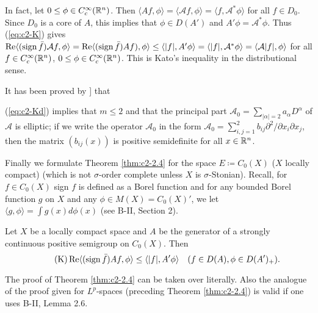 In fact, let $0 \leq \phi \in C_{c}^{\infty}(\mathbb{R}^n)$.
Then $\langle Af,\phi \rangle = \langle \mathcal{A}f,\phi \rangle = \langle f,\mathcal{A}^{*}\phi \rangle$ for all $f \in D_{0}$.
Since $D_{0}$ is a core of $A$, this implies that $\phi \in D(A')$ and $A'\phi = \mathcal{A}^{*}\phi$.
Thus (\ref{eq:c2-K})   gives $\mathop{}\!\mathrm{Re}\langle(\operatorname{sign} \bar{f})\mathcal{A}f,\phi \rangle = \mathop{}\!\mathrm{Re}\langle(\operatorname{sign} \bar{f})Af),\phi \rangle \leq \langle |f|,A'\phi \rangle = \langle |f|,\mathcal{A}^{*}\phi \rangle = \langle \mathcal{A}|f|,\phi \rangle$ for all $f \in C_{c}^{\infty}(\mathbb{R}^n)$, $0 \leq \phi \in C_{c}^{\infty}(\mathbb{R}^n)$.
This is Kato's inequality in the distributional sense.

\begin{remark*}\label{rem:c2-3.0}
It has been proved by \citet{miyajimaokazawa:1984}] that 

 (\ref{eq:c2-Kd}) implies that $m \leq 2$ and that the principal part $\mathcal{A}_{0} = \sum_{|\alpha|=2} a_{\alpha} D^{\alpha}$ of $\mathcal{A}$ is elliptic; \ie if we write the operator $\mathcal{A}_{0}$ in the form $\mathcal{A}_{0} = \sum_{i,j=1}^{2} b_{ij} \partial^{2}/\partial x_{i} \partial x_{j}$, then the matrix $(b_{ij}(x))$ is positive semidefinite for all $x \in \mathbb{R}^n$.
\end{remark*}

Finally we formulate Theorem \ref{thm:c2-2.4}   for the space $E \coloneq C_{0}(X)$ ($X$ locally compact) (which is not $\sigma$-order complete unless $X$ is $\sigma$-Stonian).
Recall, for $f \in C_{0}(X)$ sign $f$ is defined as a Borel function and for any bounded Borel function $g$ on $X$ and any $\phi \in M(X) = C_{0}(X)'$, we let $\langle g,\phi \rangle = \int g(x) d\phi(x)$ (see B-II, Section 2).
\begin{theorem}\label{thm:c2-2.6}
Let $X$ be a locally compact space and $A$ be the generator of a strongly continuous positive semigroup on 
$C_{0}(X)$.
Then
\begin{equation*}\label{eq:c2-K-3} \tag{K}
\mathop{}\!\mathrm{Re}\langle(\operatorname{sign} \bar{f})Af,\phi \rangle \leq \langle |f|,A'\phi \rangle \quad (f \in D(A), \phi \in D(A')_{+}).
\end{equation*}
\end{theorem}
The proof of Theorem \ref{thm:c2-2.4} can be taken over literally.
Also the analogue of the proof given for $L^p$-spaces (preceding Theorem \ref{thm:c2-2.4})  is valid if one uses B-II, Lemma 2.6.
